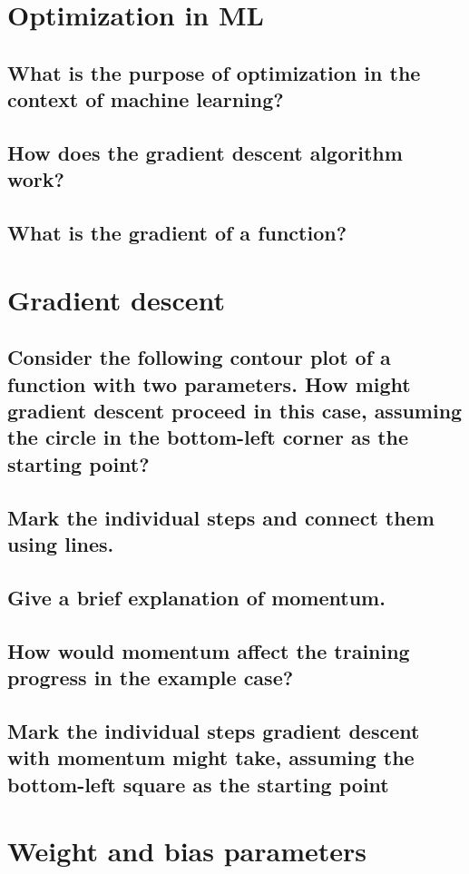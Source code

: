 
\section{Optimization in ML}
\subsection{What is the purpose of optimization in the context of machine learning?}
\subsection{How does the gradient descent algorithm work?}
\subsection{What is the gradient of a function? }


\section{Gradient descent}
\subsection{Consider the following contour plot of a function with two parameters. How might gradient descent proceed in this case, assuming the circle in the bottom-left corner as the starting point?}
\subsection{Mark the individual steps and connect them using lines.}
\subsection{Give a brief explanation of momentum.}
\subsection{How would momentum affect the training progress in the example case?}
\subsection{Mark the individual steps gradient descent with momentum might take, assuming the bottom-left square as the starting point}

\section{Weight and bias parameters}
